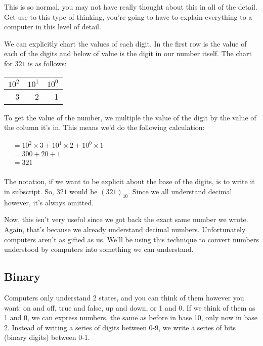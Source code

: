 This is so normal, you may not have really thought about this in all of the
detail. Get use to this type of thinking, you're going to have to explain
everything to a computer in this level of detail.

We can explicitly chart the values of each digit. In the first row is the value
of each of the digits and below of value is the digit in our number itself. The
chart for $321$ is as follows:

\begin{center}
  \begin{tabular}{r | r | r}
    $10^2$ & $10^1$ & $10^0$ \\
    \hline
         3 &      2 &      1 \\
  \end{tabular}
\end{center}

To get the value of the number, we multiple the value of the digit by the value
of the column it's in. This means we'd do the following calculation:

\begin{center}
  \begin{math}
    \begin{aligned}
&= 10^2 \times 3 + 10^1 \times 2 + 10^0 \times 1 \\
&= 300 + 20 + 1 \\
&= 321 \\
    \end{aligned}
  \end{math}
\end{center}

The notation, if we want to be explicit about the base of the digits, is to
write it in subscript. So, $321$ would be $(321)_{10}$. Since we all understand
decimal however, it's always omitted.

Now, this isn't very useful since we got back the exact same number we wrote.
Again, that's because we already understand decimal numbers. Unfortunately
computers aren't as gifted as us. We'll be using this technique to convert
numbers understood by computers into something we can understand.

\label{sec:numeral-system-binary}
\subsection{Binary}

Computers only understand 2 states, and you can think of them however you want:
on and off, true and false, up and down, or 1 and 0. If we think of them as 1
and 0, we can express numbers, the same as before in base 10, only now in base
2. Instead of writing a series of digits between 0-9, we write a series of bits
(binary digits) between 0-1.

